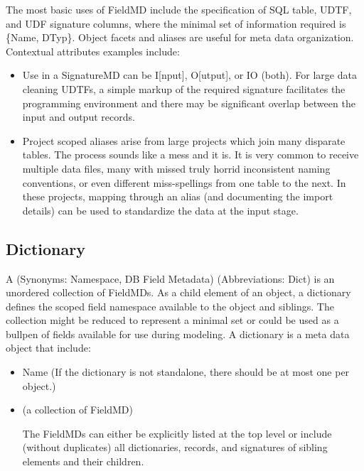 \documentclass[10pt]{article}
\begin{document}
    The most basic uses of FieldMD include the specification of SQL table, UDTF, and UDF signature columns, where 
    the minimal set of information required is \{Name, DTyp\}. Object facets and aliases are useful for meta 
    data organization.   Contextual attributes examples include:
        \begin{itemize}[label=-,noitemsep,topsep=0pt]
            \item Use in a SignatureMD can be I[nput], O[utput], or IO (both).  For large data cleaning UDTFs,
                a simple markup of the required signature facilitates the programming environment and there
                may be significant overlap between the input and output records.
            \item Project scoped aliases arise from large projects which join many disparate tables.  The process
                sounds like a mess and it is.  It is very common to receive multiple data files, many with 
                missed truly horrid inconsistent naming conventions, or even different miss-spellings from one
                table to the next.   In these projects, mapping through an alias (and documenting the import details)
                can be used to standardize the data at the input stage.
        \end{itemize}




\subsection{Dictionary\label{dictionary}}

            A  (Synonyms: Namespace, DB Field Metadata) (Abbreviations: Dict)
            is an unordered collection of FieldMDs.  As a child element of an object,
            a dictionary defines the scoped field namespace available to the object and siblings.
            The collection might be reduced to represent a minimal set or 
            could be used as a bullpen of fields available for use during modeling.
            A dictionary is a meta data object that include:
                \begin{itemize}[label=-,noitemsep,topsep=0pt]
                    \item Name (If the dictionary is not standalone, there should be at most one per object.)
                    \item {} (a collection of FieldMD)\par
                        The FieldMDs can either be explicitly listed at the top level or 
                        include (without duplicates) all dictionaries, records, and signatures of sibling elements and
                        their children.
                \end{itemize}
\end{document}
